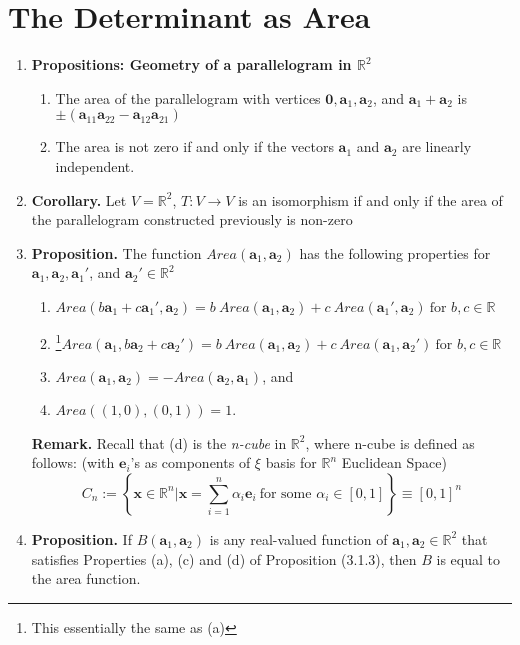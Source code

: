 \documentclass[oneside, 12pt]{book}
\newcommand{\settag}[1]{\renewcommand{\theenumi}{#1}}
\newcommand{\R}{\mathbb{R}}
\newcommand{\tbf}[1]{\textbf{#1}}
\newcommand{\trans}[3]{$#1:#2\rightarrow{}#3$}
\newcommand{\para}[1]{\item \tbf{#1}}
\newcommand{\va}{\mathbf{a}}
\newcommand{\vx}{\mathbf{x}}
\newcommand{\ve}{\mathbf{e}}
\newcommand{\vzero}{\mathbf{0}}
\begin{document}
\section{The Determinant as Area}
\begin{enumerate}
    \settag{3.1.1}
    \para{Propositions: Geometry of a parallelogram in $\R^2$} 
    \begin{enumerate}
        \item The area of the parallelogram with vertices $\vzero, \va_1, \va_2$, and $\va_1 + \va_2$ is $\pm\left(\va_{11}\va_{22} - \va_{12}\va_{21}\right)$
        \item The area is not zero if and only if the vectors $\va_1$ and $\va_2$ are linearly independent.
    \end{enumerate}
    
    \settag{3.1.2}
    \para{Corollary.} Let $V=\R^2$, \trans{T}{V}{V} is an isomorphism if and only if the area of the parallelogram constructed previously is non-zero
    
    \settag{3.1.3}
    \para{Proposition.} The function $Area(\va_1, \va_2)$ has the following properties for $\va_1,\va_2, \va_1'$, and $\va_2'\in \R^2$
    \begin{enumerate}
        \item $Area(b\va_1 + c\va_1', \va_2) = b~Area(\va_1,\va_2) + c~Area(\va_1', \va_2)~\text{for $b, c \in \R$}$
        \item \footnote{This essentially the same as (a)}$Area(\va_1, b\va_2 + c\va_2') = b~Area(\va_1,\va_2) + c~Area(\va_1, \va_2')~\text{for $b, c \in \R$}$
        \item $Area(\va_1, \va_2) = -Area(\va_2, \va_1)$, and
        \item $Area((1, 0), (0, 1)) = 1$.
    \end{enumerate}
    \textbf{Remark.} Recall that (d) is the \textit{n-cube} in $\R^2$, where n-cube is defined as follows: (with $\ve_i$'s as components of $\xi$ basis for $\R^n$ Euclidean Space)
    \begin{equation*}
        C_n := \left\{\vx \in \R^n| \vx = \sum_{i = 1}^n \alpha_i \ve_i~\text{for some $\alpha_i\in \left[0, 1\right]$}\right\} \equiv \left[0, 1\right]^n
    \end{equation*}
    
    \settag{3.1.4}
    \para{Proposition.} If $B(\va_1, \va_2)$ is any real-valued function of $\va_1, \va_2\in \R^2$ that satisfies Properties (a), (c) and (d) of Proposition (3.1.3), then $B$ is equal to the area function.
    

\end{enumerate}
\end{document}
